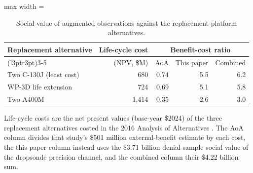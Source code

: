 \begin{table}

\caption{Social value of augmented observations against the replacement-platform alternatives. \label{tab:platform_comparison}}
\centering
\begin{adjustbox}{max width = \textwidth}
\begin{threeparttable}
\begin{tabular}[t]{lrrrr}
\toprule
Replacement alternative & Life-cycle cost & \multicolumn{3}{c}{Benefit-cost ratio}\\
\cmidrule(l{3pt}r{3pt}){3-5}
 & (NPV, \$M) & AoA & This paper & Combined\\
\midrule
Two C-130J (least cost) & 680 & 0.74 & 5.5 & 6.2\\
WP-3D life extension & 724 & 0.69 & 5.1 & 5.8\\
Two A400M & 1,414 & 0.35 & 2.6 & 3.0\\
\bottomrule
\end{tabular}
\begin{tablenotes}
\small
\item Life-cycle costs are the net present values (base-year \$2024) of the three replacement alternatives costed in the 2016 Analysis of Alternatives \citep{ANSER2016ExternalBenefits}. The AoA column divides that study's \$501 million external-benefit estimate by each cost, the this-paper column instead uses the \$3.71 billion denial-sample social value of the dropsonde precision channel, and the combined column their \$4.22 billion sum.
\end{tablenotes}
\end{threeparttable}
\end{adjustbox}
\end{table}
